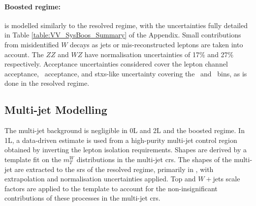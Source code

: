 \paragraph{Boosted regime:} is modelled similarly to the resolved regime, with the uncertainties fully detailed in Table \ref{table:VV_SysBoos_Summary} of the Appendix. Small contributions from misidentified $W$ decays as jets or mis-reconstructed leptons are taken into account. The $ZZ$ and $WZ$ have normalisation uncertainties of 17\% and 27\% respectively. Acceptance uncertainties considered cover the lepton channel acceptance, \ptv\ acceptance, and \gls{stxs}-like uncertainty covering the \ptv\ and \nj\ bins, as is done in the resolved regime.

\subsection{Multi-jet Modelling}\label{sec-modMultiJ} 
The multi-jet background is negligible in 0L and 2L and the boosted regime. In 1L, a data-driven estimate is used from a high-purity multi-jet control region obtained by inverting the lepton isolation requirements. Shapes are derived by a template fit on the $m_T^W$ distributions in the multi-jet \gls{cr}s. The shapes of the multi-jet are extracted to the \gls{sr}s of the resolved regime, primarily in \vhc, with extrapolation and normalisation uncertainties applied. Top and $W+$jets scale factors are applied to the template to account for the non-insignificant contributions of these processes in the multi-jet \gls{cr}s.